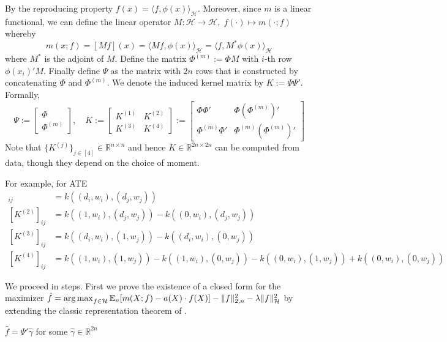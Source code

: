 By the reproducing property
$
f(x)=\langle f,\phi(x) \rangle_{\mathcal{H}}
$.  Moreover, since $m$ is a linear functional, we can define the linear operator
$
M:\mathcal{H}\rightarrow \mathcal{H},\; f(\cdot)\mapsto m(\cdot;f)
$
whereby
$$
m(x;f)=[Mf](x)=\langle Mf,\phi(x) \rangle_{\mathcal{H}} = \langle f, M^*\phi(x) \rangle_{\mathcal{H}}
$$
where $M^*$ is the adjoint of $M$. Define the matrix $\Phi^{(m)}:=\Phi M$ with $i$-th row $\phi(x_i)'M$. Finally define $\Psi$ as the matrix with $2n$ rows that is constructed by concatenating $\Phi$ and $\Phi^{(m)}$. We denote the induced kernel matrix by $K:=\Psi\Psi'$. Formally,
$$
\Psi:=\begin{bmatrix} \Phi\\ \Phi^{(m)}\end{bmatrix},\quad K:=\begin{bmatrix} K^{(1)} & K^{(2)} \\ K^{(3)}  & K^{(4)} \end{bmatrix}:=\begin{bmatrix} \Phi \Phi' & \Phi (\Phi^{(m)})' \\ \Phi^{(m)}\Phi' & \Phi^{(m)}  (\Phi^{(m)})'  \end{bmatrix} 
$$
Note that $\{K^{(j)}\}_{j\in[4]}\in \mathbb{R}^{n\times n}$ and hence $K\in\mathbb{R}^{2n\times 2n}$ can be computed from data, though they depend on the choice of moment. 
\begin{proposition}\label{prop:kernel_matrices}
For example, for ATE
\begin{align}
[K^{(1)}]_{ij}&=k((d_i,w_i),(d_j,w_j)) \\
[K^{(2)}]_{ij}&=k((1,w_i),(d_j,w_j))-k((0,w_i),(d_j,w_j)) \\
    [K^{(3)}]_{ij}&=k((d_i,w_i),(1,w_j))-k((d_i,w_i),(0,w_j)) \\
    [K^{(4)}]_{ij} &=k((1,w_i),(1,w_j))-k((1,w_i),(0,w_j))-k((0,w_i),(1,w_j))+k((0,w_i),(0,w_j))
\end{align}
\end{proposition}

We proceed in steps. First we prove the existence of a closed form for the maximizer $\hat{f}=\operatorname*{arg\,max}_{f\in\mathcal{H}} \mathbb{E}_n[m(X;f) - a(X)\cdot f(X)] - \|f\|_{2,n}^2 - \lambda \|f\|_{{\mathcal H}}^2$ by extending the classic representation theorem of \cite{kimeldorf1971some,scholkopf2001generalized}.

%

\begin{proposition}\label{prop:rep1}
$\hat{f}=\Psi'\hat{\gamma}$ for some $\hat{\gamma}\in\mathbb{R}^{2n}$
\end{proposition}

